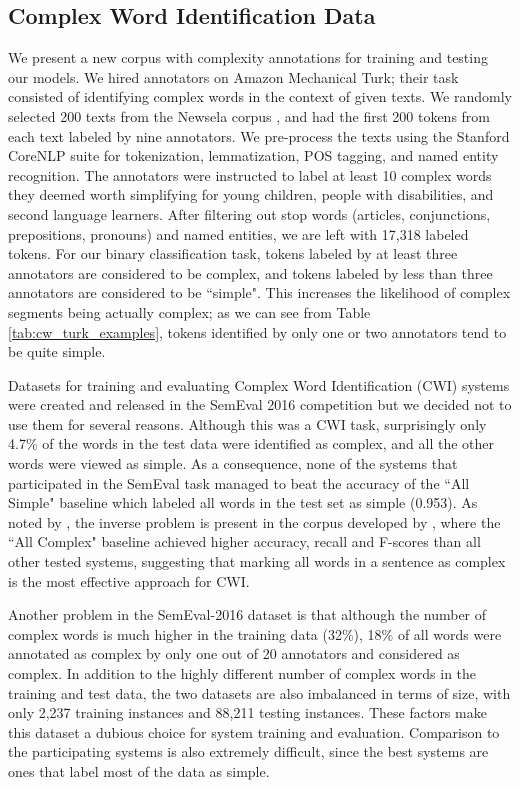 \documentclass[thesis.tex]{subfiles}
\begin{document}
\subsection{Complex Word Identification Data}

We present a new corpus with complexity annotations for training and testing our models. We hired annotators on Amazon Mechanical Turk; their task consisted of identifying complex words in the context of given texts. We randomly selected 200 texts from the Newsela corpus \citep{xu2015problems}, and had the first 200 tokens from each text labeled by nine annotators. We pre-process the texts using the Stanford CoreNLP suite \citep{manning2014stanford} for tokenization, lemmatization, POS tagging, and named entity recognition. The annotators were instructed to label at least 10 complex words they deemed worth simplifying for young children, people with disabilities, and second language learners. After filtering out stop words (articles, conjunctions, prepositions, pronouns) and named entities, we are left with 17,318 labeled tokens. For our binary classification task, tokens labeled by at least three annotators are considered to be complex, and tokens labeled by less than three annotators are considered to be ``simple". This increases the likelihood of complex segments being actually complex; as we can see from Table \ref{tab:cw_turk_examples}, tokens identified by only one or two annotators tend to be quite simple.

Datasets for training and evaluating Complex Word Identification (CWI) systems were created and released in the SemEval 2016 competition \citep{paetzold2016semeval} but we decided not to use them for several reasons. Although this was a CWI task, surprisingly only 4.7\% of the words in the test data were identified as complex, and all the other words were viewed as simple. As a consequence, none of the systems that participated in the SemEval task managed to beat the accuracy of the ``All Simple" baseline which labeled all words in the test set as simple (0.953). 
As noted by \cite{paetzold2016semeval}, the inverse problem is present in the corpus developed by \cite{shardlow2013cw}, where the ``All Complex" baseline achieved higher accuracy, recall and F-scores than all other tested systems, suggesting that marking all words in a sentence as complex is the most effective approach for CWI.

Another problem in the SemEval-2016 dataset is that although the number of complex words is much higher in the training data (32\%), 18\% of all words were annotated as complex by only one out of 20 annotators and considered as complex. In addition to the highly different number of complex words in the training and test data, the two datasets are also imbalanced in terms of size, with only 2,237 training instances and 88,211 testing instances. These factors make this dataset a dubious choice for system training and evaluation. Comparison to the participating systems is also extremely difficult, since the best systems are ones that label most of the data as simple. 
\end{document}
